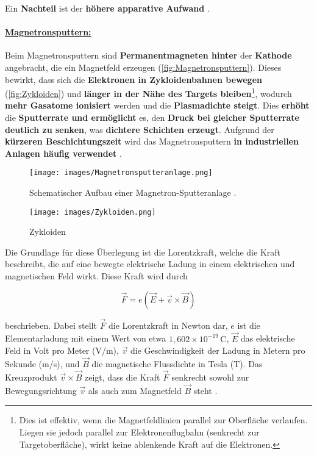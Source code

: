 \documentclass{article} %
\begin{document}
Ein \textbf{Nachteil} ist der \textbf{höhere apparative Aufwand} \cite{keplinger2024}.

\vspace{1em}
\paragraph{\uline{Magnetronsputtern:}} Beim Magnetronsputtern sind \textbf{Permanentmagneten hinter} der \textbf{Kathode} angebracht, die ein Magnetfeld erzeugen 
(\autoref{fig:Magnetronsputtern}). Dieses bewirkt, dass sich die \textbf{Elektronen in Zykloidenbahnen bewegen} (\autoref{fig:Zykloiden}) und \textbf{länger in der 
Nähe des Targets bleiben}\footnote{Dies ist effektiv, wenn die Magnetfeldlinien parallel zur Oberfläche verlaufen. Liegen sie jedoch parallel zur 
Elektronenflugbahn (senkrecht zur Targetoberfläche), wirkt keine ablenkende Kraft auf die Elektronen.}, wodurch \textbf{mehr Gasatome ionisiert} werden und die 
\textbf{Plasmadichte steigt}. Dies \textbf{erhöht} die \textbf{Sputterrate und ermöglicht} es, den \textbf{Druck bei gleicher Sputterrate deutlich zu senken}, was 
\textbf{dichtere Schichten erzeugt}. Aufgrund der \textbf{kürzeren Beschichtungszeit} wird das Magnetronsputtern \textbf{in industriellen Anlagen häufig 
verwendet} \cite{kittel2004}. \\

\begin{figure}[htb!]
    \centering
    \texttt{[image: images/Magnetronsputteranlage.png]} %
    \captionsetup{labelfont=bf} %
    \caption{Schematischer Aufbau einer Magnetron-Sputteranlage \cite{keplinger2024}.}
    \label{fig:Magnetronsputtern}
\end{figure}

\begin{figure}[htb!]
    \centering
    \texttt{[image: images/Zykloiden.png]} %
    \captionsetup{labelfont=bf} %
    \caption{Zykloiden}
    \label{fig:Zykloiden}
\end{figure}

Die Grundlage für diese Überlegung ist die Lorentzkraft, welche die Kraft beschreibt, die auf eine bewegte elektrische Ladung in einem elektrischen und 
magnetischen Feld wirkt. Diese Kraft wird durch

$$
\vec{F} = e (\vec{E} + \vec{v} \times \vec{B})
$$

beschrieben. Dabei stellt \( \vec{F} \) die Lorentzkraft in Newton dar, \( e \) ist die Elementarladung mit einem Wert von etwa 
\( 1{,}602 \times 10^{-19} \, \mathrm{C} \), \( \vec{E} \) das elektrische Feld in Volt pro Meter (V/m), \( \vec{v} \) die Geschwindigkeit der
Ladung in Metern pro Sekunde (m/s), und \( \vec{B} \) die magnetische Flussdichte in Tesla (T). Das Kreuzprodukt \( \vec{v} \times \vec{B} \) 
zeigt, dass die Kraft \( \vec{F} \) senkrecht sowohl zur Bewegungsrichtung \( \vec{v} \) als auch zum Magnetfeld \( \vec{B} \) steht \cite{rossnagel2003magnetron, 
mattox2010handbook, anders2010advances, kouznetsov1999new, prechtl2005grundlagen}. 
\end{document}
